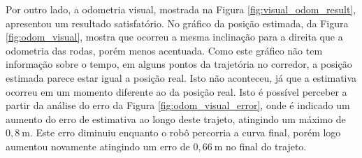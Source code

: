 \documentclass[repeatfields,xlists,xpacks,oneside,yearsonly]{ufrgscca}
\begin{document}
Por outro lado, a odometria visual, mostrada na Figura
\ref{fig:visual_odom_result}, apresentou um resultado satisfatório.
No gráfico da posição estimada, da Figura \ref{fig:odom_visual},
mostra que ocorreu a mesma inclinação para a direita que a odometria
das rodas, porém menos acentuada. Como este gráfico não tem
informação sobre o tempo, em alguns pontos da trajetória no corredor,
a posição estimada parece estar igual a posição real. Isto não
aconteceu, já que a estimativa ocorreu em um momento diferente ao da
posição real. Isto é possível perceber a partir da análise do erro da
Figura \ref{fig:odom_visual_error}, onde é indicado um aumento do
erro de estimativa ao longo deste trajeto, atingindo um máximo de
$0,8~\si{\meter}$. Este erro diminuiu enquanto o robô percorria a
curva final, porém logo aumentou novamente atingindo um erro de
$0,66~\si{\meter}$ no final do trajeto.
\end{document}
